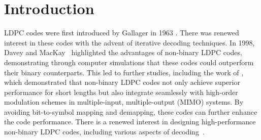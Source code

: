 \documentclass[conference]{IEEEtran}
\begin{document}
\section{Introduction}
LDPC codes were first introduced by Gallager in 1963 \cite{gallager1963low}. There was renewed interest in these codes with the advent of iterative decoding techniques. In 1998, Davey and MacKay~\cite{davey1998low} highlighted the advantages of non-binary LDPC codes, demonstrating through computer simulations that these codes could outperform their binary counterparts. This led to further studies, including the work of \cite{huang2010large}, which demonstrated that non-binary LDPC codes not only achieve superior performance for short lengths but also integrate seamlessly with high-order modulation schemes in multiple-input, multiple-output (MIMO) systems. By avoiding bit-to-symbol mapping and demapping, these codes can further enhance the code performance. There is a renewed interest in designing high-performance non-binary LDPC codes, including various aspects of decoding~\cite{costantini2012non, kang2010quasi, song2009unified, zhou2007high, chen2010two,voicila2010low,savin2008min,nozaki2012analysis, nozaki2011analysis, liu2012computing, zhao2012class}. 

\end{document}
